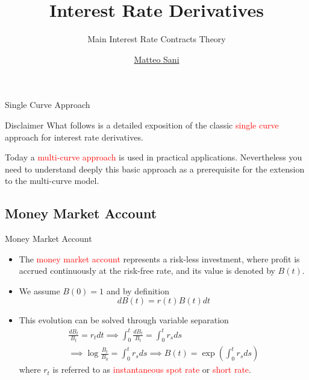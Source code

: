 \documentclass{beamer}
\title{Interest Rate Derivatives}
\subtitle{Main Interest Rate Contracts Theory}
\author{\href{mailto:matteo.sani@unisi.it}{Matteo Sani}}
\begin{document}
\begin{frame}[plain]
  \maketitle
\end{frame}

\begin{frame}{Single Curve Approach}
	\begin{block}{Disclaimer}
	What follows is a detailed exposition of the classic \textcolor{red}{single curve}
	approach for interest rate derivatives. 
	
	Today a \textcolor{red}{multi-curve approach} is
	used in practical applications. Nevertheless you need to understand
	deeply this basic approach as a prerequisite for the extension to the
	multi-curve model.
	\end{block}
\end{frame}  

\subsection{Money Market Account}
\begin{frame}{Money Market Account}
	\begin{itemize}
		\item<0-> The \textcolor{red}{money market account} represents a risk-less investment, where profit is accrued continuously at the risk-free rate, and its value is denoted by $B(t)$.
		\item<1-> We assume $B(0)=1$ and by definition
		\begin{equation}
			dB(t) = r(t)B(t)dt
		\end{equation}
		\item<2-> This evolution can be solved through variable separation
		\begin{equation}
			\begin{gathered}
				\frac{dB_t}{B_t} = r_t dt \implies \int_0^t \frac{dB_t}{B_t} = \int_0^t r_s ds \\
				\implies \log\frac{B_t}{B_0} = \int_0^t r_s ds \implies \boxed{B(t) = \exp\left(\int_0^t r_s ds\right)}
			\end{gathered}
		\end{equation}
		where $r_t$ is referred to as \textcolor{red}{instantaneous spot rate} or \textcolor{red}{short rate}.
	\end{itemize}
\end{frame}
\end{document}
